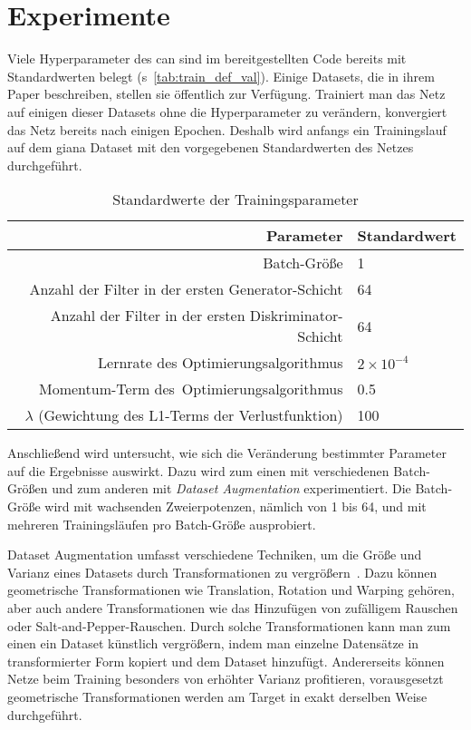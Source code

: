 \section{Experimente}

Viele Hyperparameter des \gls{can} sind im bereitgestellten Code bereits mit Standardwerten belegt (s~\autoref{tab:train_def_val}).
Einige Datasets, die \citeauthor{Isola.2017} in ihrem Paper beschreiben, stellen sie öffentlich zur Verfügung.
Trainiert man das Netz auf einigen dieser Datasets ohne die Hyperparameter zu verändern, konvergiert das Netz bereits nach einigen Epochen.
Deshalb wird anfangs ein Trainingslauf auf dem \gls{giana} Dataset mit den vorgegebenen Standardwerten des Netzes durchgeführt.

\begin{table}
	\centering
	\caption{Standardwerte der Trainingsparameter}
	\label{tab:train_def_val}
	\begin{tabular}{rl} 
		\toprule
		Parameter                                            & Standardwert  \\ 
		\midrule
		Batch-Größe                                          & 1             \\
		Anzahl der Filter in der ersten Generator-Schicht    & 64            \\
		Anzahl der Filter in der ersten Diskriminator-Schicht    & 64            \\
		Lernrate des Optimierungsalgorithmus                 & $ 2 \times 10^{-4} $    \\
		Momentum-Term des~Optimierungsalgorithmus            & 0.5           \\
		$ \lambda $ (Gewichtung des L1-Terms der Verlustfunktion) & 100           \\
		\bottomrule
	\end{tabular}
\end{table}

Anschließend wird untersucht, wie sich die Veränderung bestimmter Parameter auf die Ergebnisse auswirkt.
Dazu wird zum einen mit verschiedenen Batch-Größen und zum anderen mit \emph{Dataset Augmentation} experimentiert.
Die Batch-Größe wird mit wachsenden Zweierpotenzen, nämlich von 1 bis 64, und mit mehreren Trainingsläufen pro Batch-Größe ausprobiert.

Dataset Augmentation umfasst verschiedene Techniken, um die Größe und Varianz eines Datasets durch Transformationen zu vergrößern~\cite{Goodfellow.2016}.
Dazu können geometrische Transformationen wie Translation, Rotation und Warping gehören, aber auch andere Transformationen wie das Hinzufügen von zufälligem Rauschen oder Salt-and-Pepper-Rauschen.
Durch solche Transformationen kann man zum einen ein Dataset künstlich vergrößern, indem man einzelne Datensätze in transformierter Form kopiert und dem Dataset hinzufügt.
Andererseits können Netze beim Training besonders von erhöhter Varianz profitieren, vorausgesetzt geometrische Transformationen werden am Target in exakt derselben Weise durchgeführt.

